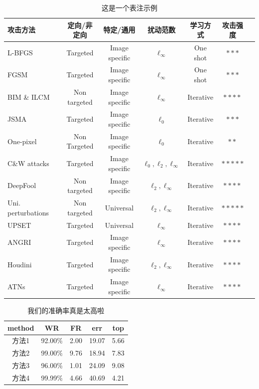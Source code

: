 \documentclass[zihao=-4]{ctexart}
\begin{document}
\begin{spacing}{1.5}
\begin{table}[t]
\centering
\caption{这是一个表注示例}
\begin{tabular}{|l||c|c|c|c|c|c|}
\hline
 {\textbf{攻击方法}}  &  定向/非定向 	   & 特定/通用 	       & 扰动范数                         & 学习方式 		& 攻击强度  \\ \hline\hline
L-BFGS~ 		          & Targeted				& Image specific		& $\ell_{\infty}$ 	              & One shot		& $***$	\\ \hline
FGSM~		              & Targeted				& Image specific		& $\ell_{\infty}$	                & One shot		& $***$ \\ \hline
BIM \& ILCM~          & Non targeted		& Image specific		& $\ell_{\infty}$	                & Iterative		& $**$$**$ 	\\ \hline
JSMA~		              & Targeted				& Image specific		& $\ell_{0}$	                    & Iterative		& $***$ 	\\ \hline
One-pixel~	          & Non Targeted		& Image specific		& $\ell_0$		                    & Iterative	  & $**$ \\ \hline
C\&W attacks~         & Targeted	      &	Image specific		&	$\ell_0, \ell_2, \ell_{\infty}$	&	Iterative   & $*****$ \\ \hline
DeepFool~             & Non targeted		& Image specific		& $\ell_2, \ell_{\infty}$	        & Iterative	  & $**$$**$ \\ \hline
Uni. perturbations~   & Non targeted    & Universal         &	$\ell_2, \ell_{\infty}$         & Iterative   & $*****$ \\ \hline
UPSET~                & Targeted		    & Universal 	      &  $\ell_{\infty}$                & Iterative   & $**$$**$ \\ \hline
ANGRI~                & Targeted		    & Image specific	  & $\ell_{\infty}$                 &	Iterative   & $**$$**$ \\ \hline
Houdini~              & Targeted		    & Image specific	  & $\ell_2, \ell_{\infty}$         & Iterative   & $**$$**$ \\ \hline
ATNs~                 & Targeted		    & Image specific	  & $\ell_{\infty}$                 & Iterative   & $**$$**$ \\ \hline
\end{tabular}
\end{table}

\begin{table}[H]
\caption{我们的准确率真是太高啦}
\centering
\begin{tabular}{ccccc}
\hline  
\textbf{method} & \textbf{WR} & \textbf{FR} & \textbf{err} & \textbf{top} \\ 
\hline  
方法1 & 92.00\% & 2.00 & 19.07  & 5.66\\
方法2 & 99.00\%   & 9.76  & 18.94 & 7.83\\
方法3 & 96.00\%   & 1.01  & 24.09  & 9.08\\
方法4 & 99.99\%   & 4.66  & 40.69 & 4.21\\
\hline
\end{tabular} 
\end{table} 


\end{spacing}
\end{document}

